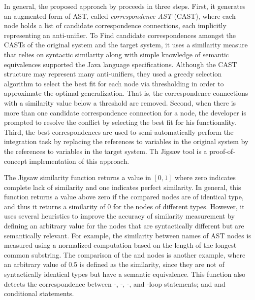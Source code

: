 In general, the proposed approach by \citet{2008:fse:cottrell} proceeds in three steps. First, it generates an augmented form of AST, called \emph{correspondence AST} (CAST), where each node holds a list of candidate correspondence connections, each implicitly representing an anti-unifier. To Find candidate correspondences amongst the CASTs of the original system and the target system, it uses a similarity measure that relies on syntactic similarity along with simple knowledge of semantic equivalences supported the Java language specifications. Although the CAST structure may represent many anti-unifiers, they used a greedy selection algorithm to select the best fit for each node via thresholding in order to approximate the optimal generalization. That is, the correspondence connections with a similarity value below a threshold are removed. Second, when there is more than one candidate correspondence connection for a node, the developer is prompted to resolve the conflict by selecting the best fit for his functionality. Third, the best correspondences are used to semi-automatically perform the integration task by replacing the references to variables in the original system by the references to variables in the target system. Th Jigsaw tool is a proof-of-concept implementation of this approach.


The Jigsaw similarity function returns a value in $[0, 1]$ where zero indicates complete lack of similarity and one indicates perfect similarity. In general, this function returns a value above zero if the compared nodes are of identical type, and thus it returns a similarity of 0 for the nodes of different types. However, it uses several heuristics to improve the accuracy of similarity measurement by defining an arbitrary value for the nodes that are syntactically different but are semantically relevant. For example, the similarity between names of AST nodes is measured using a normalized computation based on the length of the longest common substring. The comparison of the  and  nodes is another example, where an arbitrary value of 0.5 is defined as the similarity, since they are not of syntactically identical types but have a semantic equivalence. This function also detects the correspondence between -, -, -, and -loop statements; and  and  conditional statements.


